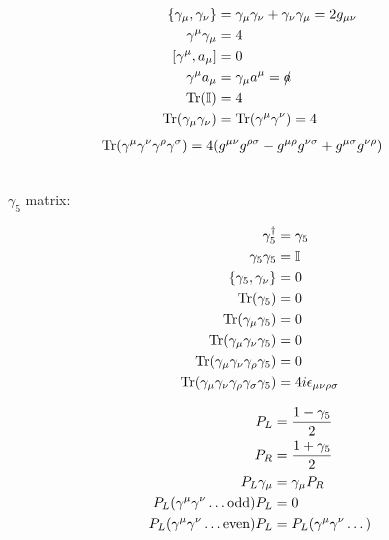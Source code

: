 \begin{minipage}{0.45\textwidth}
	\begin{align*}
		\qty{\gamma_\mu,\gamma_\nu}&=\gamma_\mu\gamma_\nu+\gamma_\nu\gamma_\mu=2g_{\mu\nu}
		\\
		\gamma^\mu\gamma_\mu&=4
		\\
		\qty[\gamma^\mu,a_\mu]&=0
		\\
		\gamma^\mu a_\mu&=\gamma_\mu a^\mu=\slashed{a}
		\\
		\Tr(\mathbb{I})&=4
		\\
		\Tr(\gamma_\mu\gamma_\nu)&=\Tr(\gamma^\mu\gamma^\nu)=4
	\end{align*}
	\begin{align*}
		\hspace{-25pt}
		\Tr(\gamma^\mu\gamma^\nu\gamma^\rho\gamma^\sigma)=4(g^{\mu\nu}g^{\rho\sigma}-g^{\mu\rho}g^{\nu\sigma}+g^{\mu\sigma}g^{\nu\rho})
	\end{align*}
\end{minipage}
\\[0.25 cm]
\(\gamma_5\) matrix:
\\
\begin{minipage}{0.45\textwidth}
	\begin{align*}
		\gamma_5^\dagger&=\gamma_5
		\\
		\gamma_{5}\gamma_{5}&=\mathbb{I}
		\\
		\qty{\gamma_5,\gamma_\nu}&=0
		\\
		\Tr(\gamma_5)&=0
		\\
		\Tr(\gamma_\mu\gamma_5)&=0
		\\
		\Tr(\gamma_\mu\gamma_\nu\gamma_5)&=0
		\\
		\Tr(\gamma_\mu\gamma_\nu\gamma_\rho\gamma_5)&=0
		\\
		\Tr(\gamma_\mu\gamma_\nu\gamma_\rho\gamma_\sigma\gamma_5)&=4i\epsilon_{\mu\nu\rho\sigma}
	\end{align*}
\end{minipage}
\begin{minipage}{0.45\textwidth}
	\begin{align*}
		P_L&=\frac{1-\gamma_5}{2}
		\\
		P_R&=\frac{1+\gamma_5}{2}
		\\
		P_L\gamma_\mu&=\gamma_\mu P_R
		\\
		P_L(\gamma^\mu\gamma^\nu\dotsc\text{odd})P_L&=0
		\\
		P_L(\gamma^\mu\gamma^\nu\dotsc\text{even})P_L&=P_L\qty(\gamma^\mu\gamma^\nu\dotsc)
	\end{align*}
\end{minipage}
\\[0.25 cm]